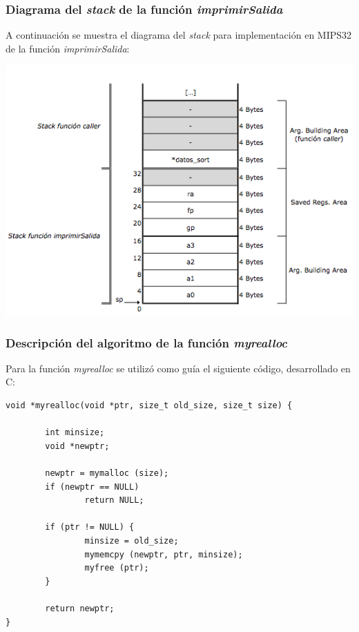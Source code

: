 \documentclass[a4paper,10pt]{article}
\begin{document}
\subsubsection{Diagrama del \textit{stack} de la funci\'on \textit{imprimirSalida}}
A continuaci\'on se muestra el diagrama del \textit{stack} para implementaci\'on en MIPS32 de la funci\'on \textit{imprimirSalida}:

\begin{center}
\includegraphics[scale=0.50]{stack_imprimirSalida.png}
\end{center}

\pagebreak

\subsubsection{Descripci\'on del algoritmo de la funci\'on \textit{myrealloc}}
Para la funci\'on \textit{myrealloc} se utiliz\'o como gu\'ia el siguiente c\'odigo, desarrollado en C:

{\footnotesize \begin{verbatim}
void *myrealloc(void *ptr, size_t old_size, size_t size) {

        int minsize;
        void *newptr;
        
        newptr = mymalloc (size);
        if (newptr == NULL)
                return NULL;

        if (ptr != NULL) {
                minsize = old_size;        
                mymemcpy (newptr, ptr, minsize);
                myfree (ptr);
        }

        return newptr;
}
\end{verbatim}}
\end{document}
